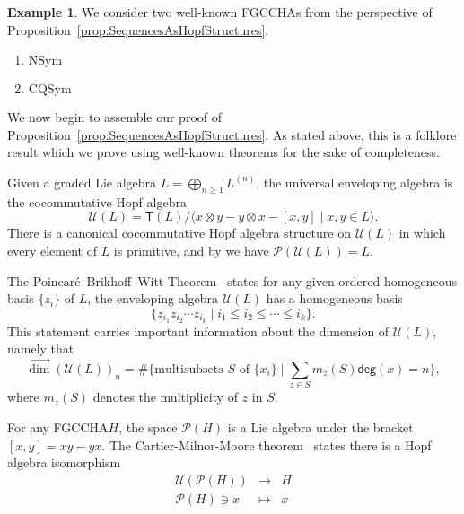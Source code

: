 \documentclass[11pt]{amsart}
\theoremstyle{definition}
\newtheorem{example}[theorem]{Example}
\numberwithin{equation}{section}
\newcommand{\FGCCHA}{\textsf{FGCCHA}\xspace}
\newcommand{\FGCCHAs}{\textsf{FGCCHA}s\xspace}
\newcommand{\vecdim}{\overrightarrow{\dim}}
\begin{document}
\begin{example}
We consider two well-known \FGCCHAs from the perspective of Proposition~\ref{prop:SequencesAsHopfStructures}.
\begin{enumerate}
\item $\mathrm{NSym}$

\item $\mathrm{CQSym}$

\end{enumerate}
\end{example}

We now begin to assemble our proof of Proposition~\ref{prop:SequencesAsHopfStructures}.  
As stated above, this is a folklore result which we prove using well-known theorems for the sake of completeness.  

Given a graded Lie algebra $L = \bigoplus_{n \ge 1} L^{(n)}$, the universal enveloping algebra is the cocommutative Hopf algebra
\[
\mathcal{U}(L) = \mathsf{T}(L) \big/ \big\langle x\otimes y - y \otimes x - [x, y] \;|\; \text{$x, y \in L$} \big\rangle.
\]
There is a canonical cocommutative Hopf algebra structure on $\mathcal{U}(L)$ in which every element of $L$ is primitive, and by \cite[Theorem 1.4]{Reutenauer-FreeLieAlgebras} we have $\mathcal{P}(\mathcal{U}(L))=L$.  

The Poincar\'{e}--Brikhoff--Witt Theorem~\cite[??]{Reutenauer} states for any given ordered homogeneous basis $\{z_i\}$ of $L$, the enveloping algebra $\mathcal{U}(L)$ has a homogeneous basis 
\[
\{ z_{i_1}z_{i_2}\cdots z_{i_k} \;|\; i_1 \leq i_2 \leq \cdots \leq i_k\}.
\]
This statement carries important information about the dimension of $\mathcal{U}(L)$, namely that 
\[
\vecdim(\mathcal{U}(L))_{n}= \#\{\text{multisubsets $S$ of $\{x_{i}\}$} \;|\; \sum_{z \in S} m_{z}(S) \mathsf{deg}(x) = n\},
\]
where $m_{z}(S)$ denotes the multiplicity of $z$ in $S$.

For any \FGCCHA $H$, the space $\mathcal{P}(H)$ is a Lie algebra under the bracket $[x, y] = xy - yx$.  
The Cartier-Milnor-Moore theorem~\cite[see Theorem 5.18]{MM65} states there is a Hopf algebra isomorphism 
\[
\begin{array}{rcl}
\mathcal{U}(\mathcal{P}(H)) &\to& H \\
\mathcal{P}(H) \ni x & \mapsto&  x
\end{array}
\]
\end{document}

